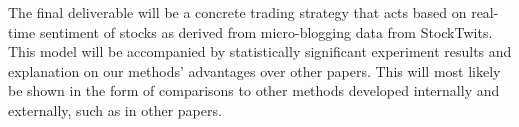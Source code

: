 The final deliverable will be a concrete trading strategy that acts based on real-time sentiment of stocks as derived from micro-blogging data from StockTwits. This model will be accompanied by statistically significant experiment results and explanation on our methods' advantages over other papers. This will most likely be shown in the form of comparisons to other methods developed internally and externally, such as in other papers.

